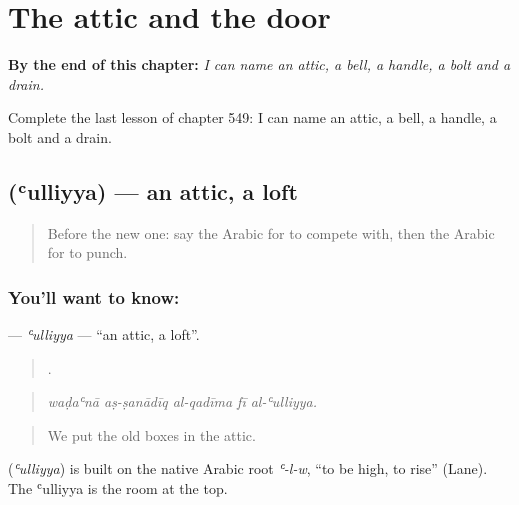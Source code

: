 
\chapter{The attic and the door}
\label{ch:ar-the-attic-and-the-door}

\begin{chapteropening}
\textbf{By the end of this chapter:} \emph{I can name an attic, a bell, a handle, a bolt and a drain.}

Complete the last lesson of chapter 549: I can name an attic, a bell, a handle, a bolt and a drain.
\end{chapteropening}

\section[\texorpdfstring{\ar{علية} (ʿulliyya)}{علية (ʿulliyya)}]{ (ʿulliyya) — an attic, a loft}

\label{lesson:AR-C549-ulliyya}



\begin{quote}
Before the new one: say the Arabic for to compete with, then the Arabic for to punch.
\end{quote}

\subsection*{You'll want to know: }
\textbf{} — \emph{ʿulliyya} — \textquotedblleft{}an attic, a loft\textquotedblright{}.

\begin{quote}
    .
\end{quote}

\begin{quote}
\emph{waḍaʿnā aṣ-ṣanādīq al-qadīma fī al-ʿulliyya.}
\end{quote}

\begin{quote}
We put the old boxes in the attic.
\end{quote}

\begin{cousinweb}
\textbf{} (\emph{ʿulliyya}) is built on the native Arabic root \emph{ʿ-l-w}, \textquotedblleft{}to be high, to rise\textquotedblright{} (Lane). The ʿulliyya is the room at the top.
\end{cousinweb}

